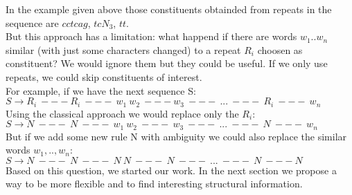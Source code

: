 	In the example given above those constituents obtainded from repeats in the sequence are $cctcag$, $tcN_3$, $tt$. \\

	But this approach has a limitation: what happend if there are words $w_1$..$w_n$ similar (with just some characters changed) to a repeat $R_i$ choosen as constituent? We would ignore them but they could be useful. 
	If we only use repeats, we could skip constituents of interest. \\

	For example, if we have the next sequence S:\\

	$S \rightarrow R_i\ --- R_i\ ---\ w_1\ w_2\ --- w_3\ ---\ ...\ ---\ R_i\ ---\ w_n\ $ \\

	Using the classical approach we would replace only the $R_i$: \\

	$S \rightarrow N\ ---\ N\ ---\ w_1\ w_2\ ---\ w_3\ ---\ ...\ ---\ N\ ---\ w_n\ $ \\

	But if we add some new rule N with ambiguity we could also replace the similar words $w_1, .. ,w_n$: \\

	$S \rightarrow N\ ---\ N\ ---\ N\ N\ ---\ N\ ---\ ...\ ---\ N\ --- N\ $ \\


	Based on this question, we started our work.
	In the next section we propose a way to be more flexible and to find interesting
	structural information.